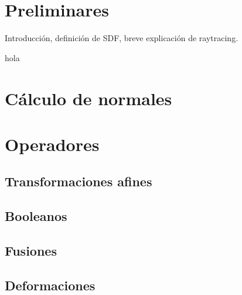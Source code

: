 
\section{Preliminares}
Introducción, definición de SDF, breve explicación de raytracing. 

\begin{definition}
    hola
\end{definition}
\section{Cálculo de normales}
\section{Operadores}
\subsection{Transformaciones afines}
\subsection{Booleanos}
\subsection{Fusiones}
\subsection{Deformaciones}